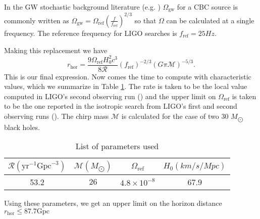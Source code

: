 \documentclass[]{article}
\newcommand{\Ogw}{\Omega_{\mathrm{gw}}}
\newcommand{\rhor}{r_{\text{hor}}}
\begin{document}
In the GW stochastic background literature (e.g. \cite{O1_stoch,O2_stoch}) $\Ogw$ for a CBC source is commonly written as $\Ogw = \Omega_{\text{ref}} (\frac{f}{f_{\text{ref}}})^{2/3}$ so that $\Omega$ can be calculated at a single frequency. 
The reference frequency for LIGO searches is $f_{\text{ref}} = 25 Hz$.  

Making this replacement we have
\begin{equation}
	\rhor=\frac{9\Omega_{\text{ref}} H_0^2 c^3}{8 \mathcal{R}} (f_{\text{ref}})^{-2/3} ( G \pi \mathcal{M})^{-5/3} .
	\label{eq:final_expression}
\end{equation}
This is our final expression.
Now comes the time to compute with characteristic values, which we summarize in Table \ref{tab:vals}. 
The rate is taken to be the local value computed in LIGO's second observing run (\cite{O2_rates}) and the upper limit on $\Omega_{\text{ref}}$ is taken to be the one reported in the isotropic search from LIGO's first and second observing runs (\cite{O2_stoch}).
The chirp mass $\mathcal{M}$ is calculated for the case of two 30 $M_{\bigodot}$ black holes.
\begin{table}
	\centering
\begin{tabular}{c|c|c|c}
	$\mathcal{R} (\mathrm{yr}^{-1} \mathrm{Gpc}^{-3})$ & $\mathcal{M} (M_{\bigodot})$  & $\Omega_{\text{ref}} $ & $H_0 (km/s/Mpc)$ \\
	\hline
	 53.2 & $26$ & $4.8\times10^{-8}$ & 67.9 \\
\end{tabular} 
\caption{List of parameters used}
\label{tab:vals}
\end{table}

Using these parameters, we get an upper limit on the horizon distance $\boxed{r_{\text{hor}} \leq 87.7 \mathrm{Gpc}}$
\end{document}
